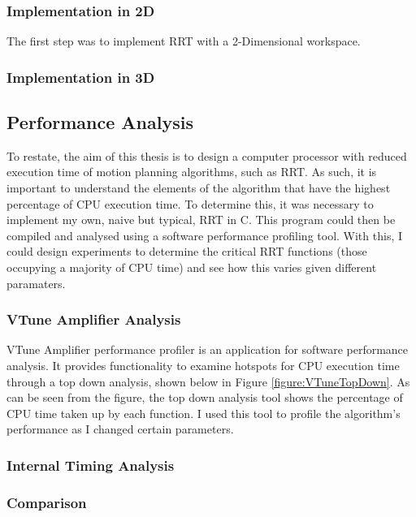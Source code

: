     \subsubsection{Implementation in 2D}
    The first step was to implement RRT with a 2-Dimensional workspace. 
    

    \subsubsection{Implementation in 3D}
    

    


\subsection{Performance Analysis}
    To restate, the aim of this thesis is to design a computer processor with reduced execution time of motion planning algorithms, such as \ac{RRT}. As such, it is important to understand the elements of the algorithm that have the highest percentage of CPU execution time. To determine this, it was necessary to implement my own, naive but typical, \ac{RRT} in C. This program could then be compiled and analysed using a software performance profiling tool. With this, I could design experiments to determine the critical RRT functions (those occupying a majority of CPU time) and see how this varies given different paramaters.

    \subsubsection{VTune Amplifier Analysis}
        VTune Amplifier performance profiler is an application for software performance analysis. It provides functionality to examine hotspots for CPU execution time through a top down analysis, shown below in Figure \ref{figure:VTuneTopDown}. As can be seen from the figure, the top down analysis tool shows the percentage of CPU time taken up by each function. I used this tool to profile the algorithm's performance as I changed certain parameters.
        

    \subsubsection{Internal Timing Analysis}

    \subsubsection{Comparison}